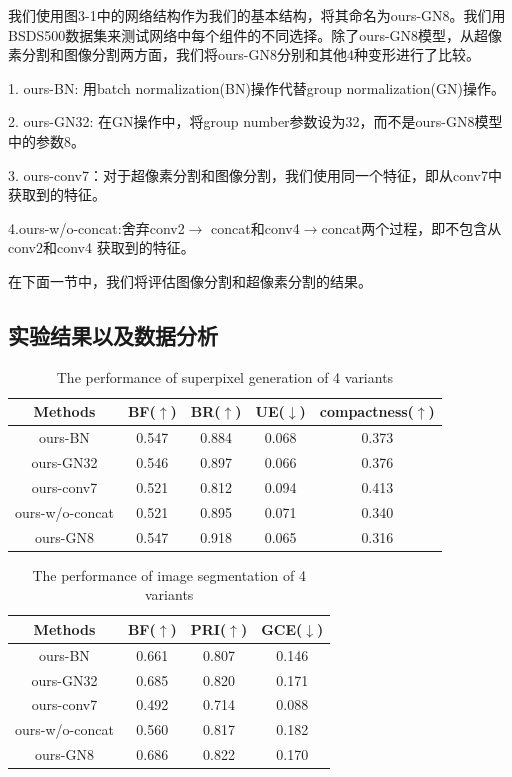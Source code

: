 我们使用图3-1中的网络结构作为我们的基本结构，将其命名为ours-GN8。我们用BSDS500数据集来测试网络中每个组件的不同选择。除了ours-GN8模型，从超像素分割和图像分割两方面，我们将ours-GN8分别和其他4种变形进行了比较。

1. ours-BN: 用batch normalization(BN)操作代替group normalization(GN)操作。

2. ours-GN32: 在GN操作中，将group number参数设为32，而不是ours-GN8模型中的参数8。

3. ours-conv7：对于超像素分割和图像分割，我们使用同一个特征，即从conv7中获取到的特征。

4.ours-w/o-concat:舍弃conv2$\rightarrow$ concat和conv4$\rightarrow$concat两个过程，即不包含从conv2和conv4 获取到的特征。

在下面一节中，我们将评估图像分割和超像素分割的结果。

\subsection{实验结果以及数据分析}

\begin{table}[htbp]
\caption{The performance of superpixel generation of 4 variants}\label{tab:table1}
\vspace{0.5em}\centering\wuhao
\begin{tabular}{ccccc}
\toprule[1.5pt]
Methods & BF($\uparrow$) & BR($\uparrow$) & UE($\downarrow$) & compactness($\uparrow$) \\
\midrule[1pt]
ours-BN         & 0.547 & 0.884 & 0.068 & 0.373\\
ours-GN32       & 0.546 & 0.897 & 0.066 & 0.376\\
ours-conv7      & 0.521 & 0.812 & 0.094 & 0.413\\
ours-w/o-concat & 0.521 & 0.895 & 0.071 & 0.340\\
\midrule[1pt]
ours-GN8        & 0.547 & 0.918 & 0.065 & 0.316\\
\bottomrule[1.5pt]
\end{tabular}
\end{table}

\begin{table}[htbp]
\caption{The performance of image segmentation of 4 variants}\label{tab:table2}
\vspace{0.5em}\centering\wuhao
\begin{tabular}{cccc}
\toprule[1.5pt]
Methods & BF($\uparrow$) & PRI($\uparrow$) & GCE($\downarrow$) \\
\midrule[1pt]
ours-BN          & 0.661 & 0.807 & 0.146 \\
ours-GN32        & 0.685 & 0.820 & 0.171 \\
ours-conv7       & 0.492 & 0.714 & 0.088\\
ours-w/o-concat  & 0.560 & 0.817 & 0.182 \\
\midrule[1pt]
ours-GN8         & 0.686 & 0.822 & 0.170 \\
\bottomrule[1.5pt]
\end{tabular}
\vspace{\baselineskip}
\end{table}

